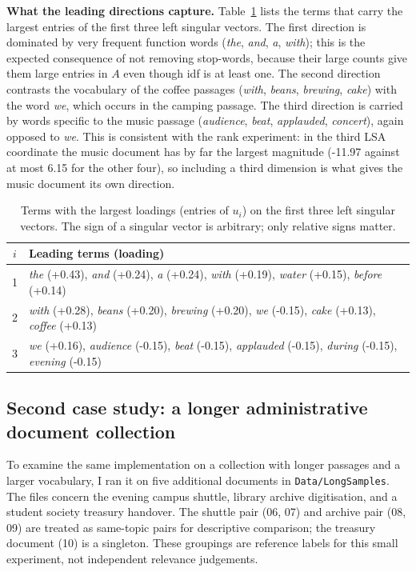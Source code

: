 \documentclass[12pt,a4paper]{report}
\theoremstyle{plain}
\theoremstyle{definition}
\theoremstyle{remark}
\theoremstyle{definition}
\begin{document}
\textbf{What the leading directions capture.} Table~\ref{tab:dirs} lists the terms that carry the largest entries of the first three left singular vectors. The first direction is dominated by very frequent function words (\emph{the}, \emph{and}, \emph{a}, \emph{with}); this is the expected consequence of not removing stop-words, because their large counts give them large entries in $A$ even though idf is at least one. The second direction contrasts the vocabulary of the coffee passages (\emph{with}, \emph{beans}, \emph{brewing}, \emph{cake}) with the word \emph{we}, which occurs in the camping passage. The third direction is carried by words specific to the music passage (\emph{audience}, \emph{beat}, \emph{applauded}, \emph{concert}), again opposed to \emph{we}. This is consistent with the rank experiment: in the third LSA coordinate the music document has by far the largest magnitude (-11.97 against at most 6.15 for the other four), so including a third dimension is what gives the music document its own direction.

\begin{table}[H]
\centering
\caption{Terms with the largest loadings (entries of $u_i$) on the first three left singular vectors. The sign of a singular vector is arbitrary; only relative signs matter.}\label{tab:dirs}
\small
\begin{tabular}{@{}cp{}@{}}
\toprule
$i$ & Leading terms (loading)\\
\midrule
1 & \emph{the} (+0.43), \emph{and} (+0.24), \emph{a} (+0.24), \emph{with} (+0.19), \emph{water} (+0.15), \emph{before} (+0.14)\\
2 & \emph{with} (+0.28), \emph{beans} (+0.20), \emph{brewing} (+0.20), \emph{we} (-0.15), \emph{cake} (+0.13), \emph{coffee} (+0.13)\\
3 & \emph{we} (+0.16), \emph{audience} (-0.15), \emph{beat} (-0.15), \emph{applauded} (-0.15), \emph{during} (-0.15), \emph{evening} (-0.15)\\
\bottomrule
\end{tabular}
\end{table}

\subsection{Second case study: a longer administrative document collection}

To examine the same implementation on a collection with longer passages and a larger vocabulary, I ran it on five additional documents in \texttt{Data/LongSamples}. The files concern the evening campus shuttle, library archive digitisation, and a student society treasury handover. The shuttle pair (06, 07) and archive pair (08, 09) are treated as same-topic pairs for descriptive comparison; the treasury document (10) is a singleton. These groupings are reference labels for this small experiment, not independent relevance judgements.
\end{document}
